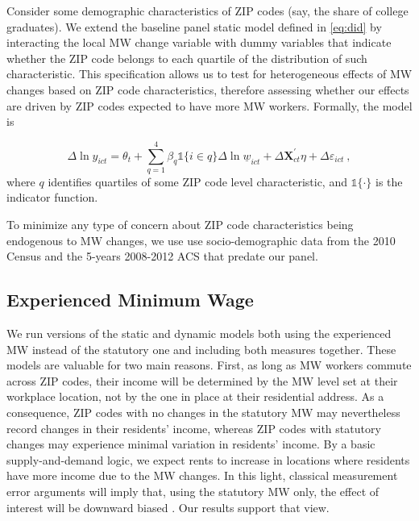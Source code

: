 Consider some demographic characteristics of ZIP codes (say, the share of college graduates).
We extend the baseline panel static model defined in \autoref{eq:did} by interacting the local 
MW change variable with dummy variables that indicate whether the ZIP code belongs to each 
quartile of the distribution of such characteristic. This specification allows us to test for 
heterogeneous effects of MW changes based on ZIP code characteristics, therefore assessing 
whether our effects are driven by ZIP codes expected to have more MW workers. Formally, the 
model is

\begin{equation}\label{eq:diff_main_hetero} 
    \Delta \ln y_{ict} = \theta_t
    				+ \sum_{q = 1}^4 \beta_q \mathds{1}\{i \in q\} \Delta \ln \underline{w}_{ict}
    				+ \Delta \mathbf{X}^{'}_{ct}\eta
    				+ \Delta \varepsilon_{ict} \ ,
\end{equation}
where $q$ identifies quartiles of some ZIP code level characteristic, and $\mathds{1}\{\cdot\}$ 
is the indicator function.

To minimize any type of concern about ZIP code characteristics being endogenous to MW changes, 
we use use socio-demographic data from the 2010 Census and the 5-years 2008-2012 ACS that 
predate our panel.


\subsection{Experienced Minimum Wage}\label{sec:emp_strategy_expmw}

We run versions of the static and dynamic models both using the experienced MW instead 
of the statutory one and including both measures together. These models are valuable for two main 
reasons. First, as long as MW workers commute across ZIP codes, their income will be determined 
by the MW level set at their workplace location, not by the one in place at their residential 
address. As a consequence, ZIP codes with no changes in the statutory MW may nevertheless record 
changes in their residents' income, whereas ZIP codes with statutory changes may experience minimal 
variation in residents' income. By a basic supply-and-demand logic, we expect rents to increase in 
locations where residents have more income due to the MW changes. In this light, classical 
measurement error arguments will imply that, using the statutory MW only, the effect of interest 
will be downward biased \parencite{AngristPischke2009}. Our results support that view. 

